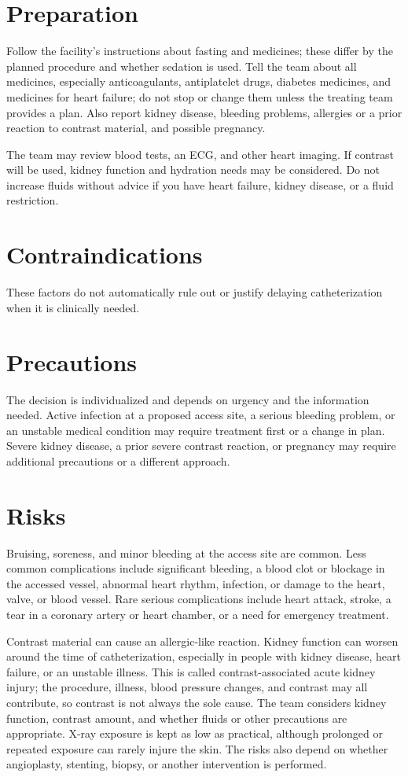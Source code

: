 \section*{Preparation}
Follow the facility's instructions about fasting and medicines; these differ by the planned procedure and whether sedation is used. Tell the team about all medicines, especially anticoagulants, antiplatelet drugs, diabetes medicines, and medicines for heart failure; do not stop or change them unless the treating team provides a plan. Also report kidney disease, bleeding problems, allergies or a prior reaction to contrast material, and possible pregnancy.

The team may review blood tests, an ECG, and other heart imaging. If contrast will be used, kidney function and hydration needs may be considered. Do not increase fluids without advice if you have heart failure, kidney disease, or a fluid restriction.

\section*{Contraindications}
These factors do not automatically rule out or justify delaying catheterization when it is clinically needed.

\section*{Precautions}
The decision is individualized and depends on urgency and the information needed. Active infection at a proposed access site, a serious bleeding problem, or an unstable medical condition may require treatment first or a change in plan. Severe kidney disease, a prior severe contrast reaction, or pregnancy may require additional precautions or a different approach.

\section*{Risks}
Bruising, soreness, and minor bleeding at the access site are common. Less common complications include significant bleeding, a blood clot or blockage in the accessed vessel, abnormal heart rhythm, infection, or damage to the heart, valve, or blood vessel. Rare serious complications include heart attack, stroke, a tear in a coronary artery or heart chamber, or a need for emergency treatment.

Contrast material can cause an allergic-like reaction. Kidney function can worsen around the time of catheterization, especially in people with kidney disease, heart failure, or an unstable illness. This is called contrast-associated acute kidney injury; the procedure, illness, blood pressure changes, and contrast may all contribute, so contrast is not always the sole cause. The team considers kidney function, contrast amount, and whether fluids or other precautions are appropriate. X-ray exposure is kept as low as practical, although prolonged or repeated exposure can rarely injure the skin. The risks also depend on whether angioplasty, stenting, biopsy, or another intervention is performed.

